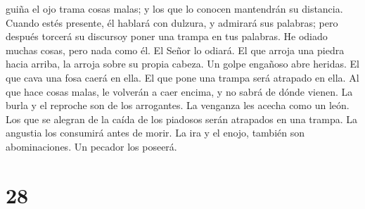 guiña el ojo trama cosas malas; y los que lo conocen mantendrán su
distancia.  Cuando estés presente, él hablará con
dulzura, y admirará sus palabras; pero después torcerá su discursoy
poner una trampa en tus palabras.  He odiado muchas
cosas, pero nada como él. El Señor lo odiará.  El que
arroja una piedra hacia arriba, la arroja sobre su propia cabeza. Un
golpe engañoso abre heridas.  El que cava una fosa caerá
en ella. El que pone una trampa será atrapado en ella. 
Al que hace cosas malas, le volverán a caer encima, y no sabrá de dónde
vienen.  La burla y el reproche son de los arrogantes. La
venganza les acecha como un león.  Los que se alegran de
la caída de los piadosos serán atrapados en una trampa. La angustia los
consumirá antes de morir.  La ira y el enojo, también son
abominaciones. Un pecador los poseerá.

\hypertarget{section-27}{%
\section{28}\label{section-27}}


